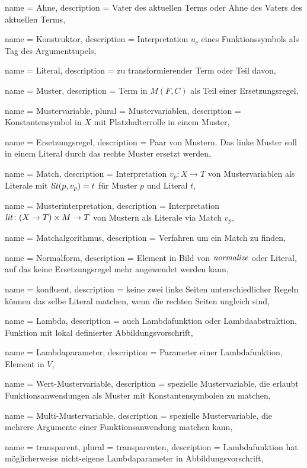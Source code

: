 {
    name = Ahne,
    description = {Vater des aktuellen Terms oder Ahne des Vaters des aktuellen Terms},
}

{
    name = Konstruktor,
    description = {Interpretation $u_c$ eines Funktionssymbols als Tag des Argumenttupels},
}


{
    name = Literal,
    description = {zu transformierender Term oder Teil davon},
}

{
    name = Muster,
    description = {Term in $M(F, C)$ als Teil einer Ersetzungsregel},
}

{
    name = Mustervariable,
    plural = Mustervariablen,
    description = {Konstantensymbol in $X$ mit Platzhalterrolle in einem Muster},
}

{
    name = Ersetzungsregel,
    description = {Paar von Mustern. Das linke Muster soll in einem Literal durch das rechte Muster ersetzt werden},
}

{
    name = Match,
    description = {Interpretation $v_p \colon X \rightarrow T$ von Mustervariablen als Literale mit $\mathit{lit}(p, v_p) = t$ für Muster $p$ und Literal $t$},
}

{
    name = Musterinterpretation,
    description = {Interpretation $\Const{lit} \colon \paren*{X \rightarrow T} \times M \rightarrow T$ von Mustern als Literale via Match $v_p$},
}

{
    name = Matchalgorithmus,
    description = {Verfahren um ein Match zu finden},
}

{
    name = Normalform,
    description = {Element in Bild von $\mathit{normalize}$ oder Literal, auf das keine Ersetzungsregel mehr angewendet werden kann},
}

{
    name = konfluent,
    description = {keine zwei linke Seiten unterschiedlicher Regeln können das selbe Literal matchen, wenn die rechten Seiten ungleich sind},
}

{
    name = Lambda,
    description = {auch Lambdafunktion oder Lambdaabstraktion, Funktion mit lokal definierter Abbildungsvorschrift},
}

{
    name = Lambdaparameter,
    description = {Parameter einer Lambdafunktion, Element in $V$},
}

{
    name = Wert-Mustervariable,
    description = {spezielle Mustervariable, die erlaubt Funktionsanwendungen als Muster mit Konstantensymbolen zu matchen},
}

{
    name = Multi-Mustervariable,
    description = {spezielle Mustervariable, die mehrere Argumente einer Funktionsanwendung matchen kann},
}

{
    name = transparent,
    plural = transparenten,
    description = {Lambdafunktion hat möglicherweise nicht-eigene Lambdaparameter in Abbildungsvorschrift},
}




